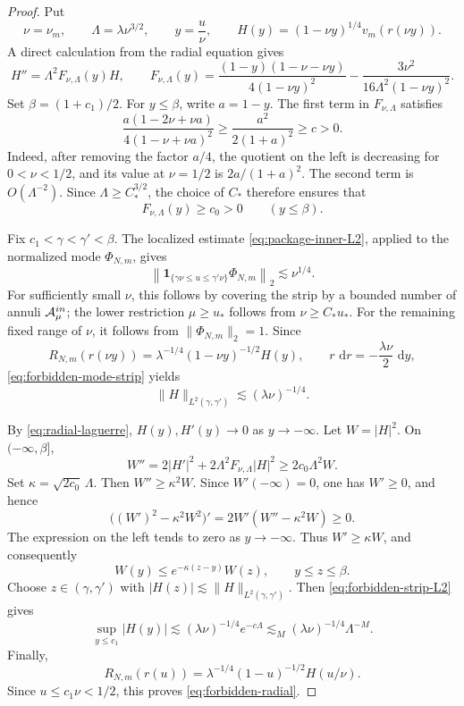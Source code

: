 \documentclass[10pt,a4paper]{amsart}
\numberwithin{equation}{section}
\newcommand{\one}{\mathbf 1}
\newcommand{\dd}{\,\mathrm d}
\newcommand{\norm}[1]{\lVert #1\rVert}
\begin{document}
\begin{proof}
Put
\[
 \nu=\nu_m,\qquad \Lambda=\lambda\nu^{3/2},\qquad y=\frac u\nu,
 \qquad H(y)=(1-\nu y)^{1/4}v_m(r(\nu y)).
\]
A direct calculation from the radial equation gives
\[
 H''=\Lambda^2F_{\nu,\Lambda}(y)H,
 \qquad
 F_{\nu,\Lambda}(y)
 =\frac{(1-y)(1-\nu-\nu y)}{4(1-\nu y)^2}
 -\frac{3\nu^2}{16\Lambda^2(1-\nu y)^2}.
\]
Set \(\beta=(1+c_1)/2\). For \(y\le\beta\), write \(a=1-y\). The first
term in \(F_{\nu,\Lambda}\) satisfies
\[
 \frac{a(1-2\nu+\nu a)}{4(1-\nu+\nu a)^2}
 \ge \frac{a^2}{2(1+a)^2}\ge c>0.
\]
Indeed, after removing the factor \(a/4\), the quotient on the left is
decreasing for \(0<\nu<1/2\), and its value at \(\nu=1/2\) is
\(2a/(1+a)^2\). The second term is \(O(\Lambda^{-2})\). Since
\(\Lambda\ge C_*^{3/2}\), the choice of \(C_*\) therefore ensures that
\begin{equation}\label{eq:forbidden-positivity}
 F_{\nu,\Lambda}(y)\ge c_0>0\qquad(y\le\beta).
\end{equation}

Fix \(c_1<\gamma<\gamma'<\beta\). The localized estimate
\eqref{eq:package-inner-L2}, applied to the normalized mode
\(\Phi_{N,m}\), gives
\begin{equation}\label{eq:forbidden-mode-strip}
 \left\|\one_{\{\gamma\nu\le u\le\gamma'\nu\}}\Phi_{N,m}\right\|_2
 \lesssim \nu^{1/4}.
\end{equation}
For sufficiently small \(\nu\), this follows by covering the strip by a
bounded number of annuli \(\mathcal A_\mu^{\rm in}\); the lower restriction
\(\mu\ge u_*\) follows from \(\nu\ge C_*u_*\). For the remaining fixed range
of \(\nu\), it follows from \(\|\Phi_{N,m}\|_2=1\). Since
\[
 R_{N,m}(r(\nu y))
 =\lambda^{-1/4}(1-\nu y)^{-1/2}H(y),
 \qquad r\,\dd r=-\frac{\lambda\nu}{2}\,\dd y,
\]
\eqref{eq:forbidden-mode-strip} yields
\begin{equation}\label{eq:forbidden-strip-L2}
 \norm H_{L^2(\gamma,\gamma')}
 \lesssim(\lambda\nu)^{-1/4}.
\end{equation}

By \eqref{eq:radial-laguerre}, \(H(y),H'(y)\to0\) as \(y\to-\infty\).
Let \(W=|H|^2\). On \(( -\infty,\beta]\),
\[
 W''=2|H'|^2+2\Lambda^2F_{\nu,\Lambda}|H|^2
 \ge2c_0\Lambda^2W.
\]
Set \(\kappa=\sqrt{2c_0}\,\Lambda\). Then \(W''\ge\kappa^2W\). Since
\(W'(-\infty)=0\), one has \(W'\ge0\), and hence
\[
 \bigl((W')^2-\kappa^2W^2\bigr)'
 =2W'(W''-\kappa^2W)\ge0.
\]
The expression on the left tends to zero as \(y\to-\infty\). Thus
\(W'\ge\kappa W\), and consequently
\[
 W(y)\le e^{-\kappa(z-y)}W(z),
 \qquad y\le z\le\beta.
\]
Choose \(z\in(\gamma,\gamma')\) with
\(|H(z)|\lesssim\norm H_{L^2(\gamma,\gamma')}\). Then
\eqref{eq:forbidden-strip-L2} gives
\[
 \sup_{y\le c_1}|H(y)|
 \lesssim(\lambda\nu)^{-1/4}e^{-c\Lambda}
 \lesssim_M(\lambda\nu)^{-1/4}\Lambda^{-M}.
\]
Finally,
\[
 R_{N,m}(r(u))
 =\lambda^{-1/4}(1-u)^{-1/2}H(u/\nu).
\]
Since \(u\le c_1\nu<1/2\), this proves \eqref{eq:forbidden-radial}.
\end{proof}
\end{document}

